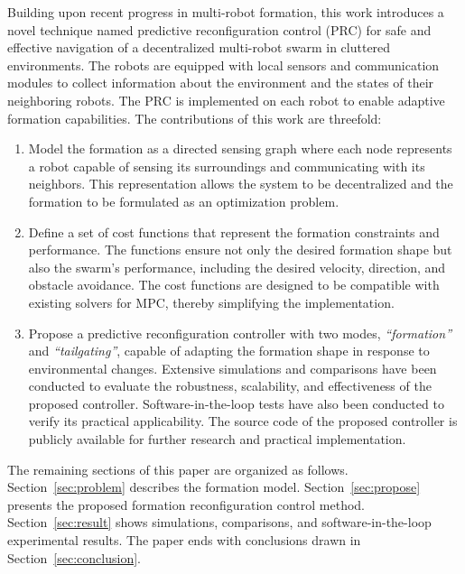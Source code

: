 Building upon recent progress in multi-robot formation, this work introduces a novel technique named predictive reconfiguration control (PRC) for safe and effective navigation of a decentralized multi-robot swarm in cluttered environments. The robots are equipped with local sensors and communication modules to collect information about the environment and the states of their neighboring robots. The PRC is implemented on each robot to enable adaptive formation capabilities. The contributions of this work are threefold:
\begin{enumerate}
    \item Model the formation as a directed sensing graph where each node represents a robot capable of sensing its surroundings and communicating with its neighbors. This representation allows the system to be decentralized and the formation to be formulated as an optimization problem.
    \item Define a set of cost functions that represent the formation constraints and performance. The functions ensure not only the desired formation shape but also the swarm's performance, including the desired velocity, direction, and obstacle avoidance. The cost functions are designed to be compatible with existing solvers for MPC, thereby simplifying the implementation.
    \item Propose a predictive reconfiguration controller with two modes, \textit{``formation''} and \textit{``tailgating''}, capable of adapting the formation shape in response to environmental changes. Extensive simulations and comparisons have been conducted to evaluate the robustness, scalability, and effectiveness of the proposed controller. Software-in-the-loop tests have also been conducted to verify its practical applicability. The source code of the proposed controller is publicly available for further research and practical implementation.
\end{enumerate}

The remaining sections of this paper are organized as follows. Section~\ref{sec:problem} describes the formation model. Section~\ref{sec:propose} presents the proposed formation reconfiguration control method. Section~\ref{sec:result} shows simulations, comparisons, and software-in-the-loop experimental results. The paper ends with conclusions drawn in Section~\ref{sec:conclusion}.
